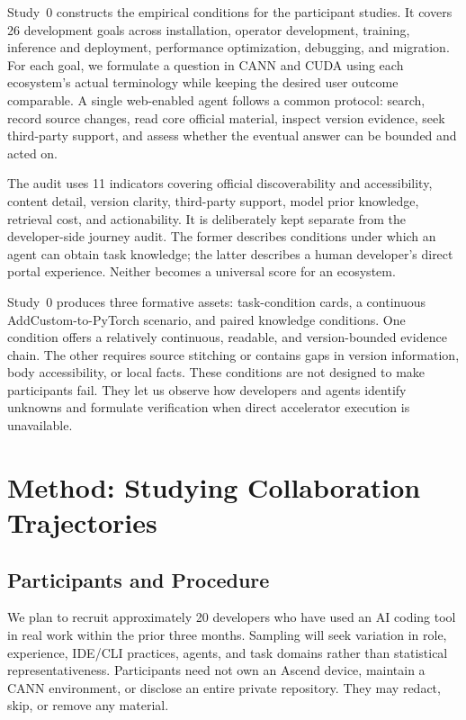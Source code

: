 \documentclass[manuscript,review,anonymous]{acmart}
\begin{document}
Study~0 constructs the empirical conditions for the participant studies. It covers 26 development goals across installation, operator development, training, inference and deployment, performance optimization, debugging, and migration. For each goal, we formulate a question in CANN and CUDA using each ecosystem's actual terminology while keeping the desired user outcome comparable. A single web-enabled agent follows a common protocol: search, record source changes, read core official material, inspect version evidence, seek third-party support, and assess whether the eventual answer can be bounded and acted on.

The audit uses 11 indicators covering official discoverability and accessibility, content detail, version clarity, third-party support, model prior knowledge, retrieval cost, and actionability. It is deliberately kept separate from the developer-side journey audit. The former describes conditions under which an agent can obtain task knowledge; the latter describes a human developer's direct portal experience. Neither becomes a universal score for an ecosystem.

Study~0 produces three formative assets: task-condition cards, a continuous AddCustom-to-PyTorch scenario, and paired knowledge conditions. One condition offers a relatively continuous, readable, and version-bounded evidence chain. The other requires source stitching or contains gaps in version information, body accessibility, or local facts. These conditions are not designed to make participants fail. They let us observe how developers and agents identify unknowns and formulate verification when direct accelerator execution is unavailable.

\section{Method: Studying Collaboration Trajectories}

\subsection{Participants and Procedure}

We plan to recruit approximately 20 developers who have used an AI coding tool in real work within the prior three months. Sampling will seek variation in role, experience, IDE/CLI practices, agents, and task domains rather than statistical representativeness. Participants need not own an Ascend device, maintain a CANN environment, or disclose an entire private repository. They may redact, skip, or remove any material.
\end{document}
